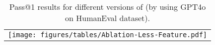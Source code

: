 \begin{table}[h]
    \centering
    \begin{tabular}{c}
    \hspace*{-0.35cm}
    \texttt{[image: figures/tables/Ablation-Less-Feature.pdf]}
    \end{tabular}
    \caption{Pass@1 results for different versions of \tool (by using GPT4o on HumanEval dataset).}
    \label{tab:agent-disabling}
\end{table}
